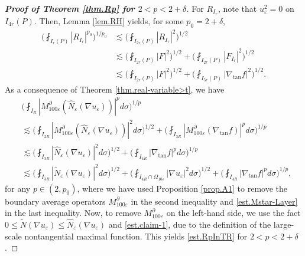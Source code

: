 \documentclass[reqno,12pt]{amsart} %
\theoremstyle{definition}
\theoremstyle{remark}
\numberwithin{equation}{section}
\newcommand{\e}{\varepsilon}
\begin{document}
\begin{proof}[\textbf{Proof of Theorem \ref{thm.Rp} for $2<p<2+\delta$}]
For $R_{I_r}$, note that $u_\e^2 = 0$ on $I_{4r}(P)$. Then, Lemma \ref{lem.RH} yields, for some $p_0 = 2+\delta$,
\begin{equation}
\begin{aligned}
    \bigg(\fint_{I_r(P)} |R_{I_r}|^{p_0} \bigg)^{1/p_0} & \lesssim \bigg(\fint_{I_{2r}(P)} |R_{I_{r}}|^{2} \bigg)^{1/2} \\
    &\lesssim \bigg(\fint_{I_{2r}(P)} |F|^{2} \bigg)^{1/2} + \bigg(\fint_{I_{2r}(P)} |F_{I_{r}}|^{2} \bigg)^{1/2} \\
    & \lesssim \bigg(\fint_{I_{2r}(P)} |F|^{2} \bigg)^{1/2} + \bigg(\fint_{I_{5r}(P)} |\nabla_{\tan} f|^{2} \bigg)^{1/2}.
    \end{aligned}
\end{equation}
As a consequence of Theorem \ref{thm.real-variable>t}, we have
\begin{equation}
\begin{aligned}
    & \bigg( \fint_{I_R} | M_{100\e}^{\partial} (\widehat{N}_\e (\nabla u_\e))|^{p} d\sigma \bigg)^{1/{p}}  \\
    & \lesssim \bigg( \fint_{I_{2R}} |M_{100\e}^{\partial}(\widehat{N}_\e(\nabla u_\e))|^{2} d\sigma \bigg)^{1/{2}} + \bigg( \fint_{I_{3R}} |M_{100\e}^{\partial}(\nabla_{\tan} f)|^{p} d\sigma \bigg)^{1/p} \\
     & \lesssim \bigg( \fint_{I_{3R}} |\widehat{N}_\e(\nabla u_\e)|^{2} d\sigma \bigg)^{1/{2}} + \bigg( \fint_{I_{4R}} |\nabla_{\tan} f|^{p} d\sigma \bigg)^{1/p}\\
     & \lesssim \bigg( \fint_{I_{3R}} |\widetilde{N}_\e(\nabla u_\e)|^{2} d\sigma \bigg)^{1/{2}} + \bigg( \fint_{I_{4R}\cap \Omega_{10\e}} |\nabla u_\e|^{2} d\sigma \bigg)^{1/{2}} + \bigg( \fint_{I_{4R}} |\nabla_{\tan} f|^{p} d\sigma \bigg)^{1/p},
    \end{aligned}
\end{equation}
for any $p\in (2,p_0)$, where we have used  Proposition \ref{prop.A1} to remove the boundary average operators $M_{100\e}^\partial$ in the second inequality and \eqref{est.Mstar-Layer} in the last inequality. Now, to remove $M_{100\e}^\partial$ on the left-hand side, we use the fact
$0\le \widetilde{N}(\nabla u_\e) \le \widehat{N}_\e(\nabla u_\e)$ and \eqref{est.claim-1}, due to the definition of the large-scale nontangential maximal function. This yields \eqref{est.RpInTR} for $2<p<2+\delta$.


\end{proof}
\end{document}
